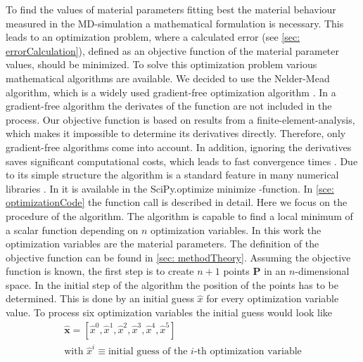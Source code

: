 To find the values of material parameters fitting best the material behaviour measured in the MD-simulation a mathematical formulation is necessary. This leads to an optimization problem, where a calculated error (see \autoref{sec: errorCalculation}), defined as an objective function of the material parameter values, should be minimized. To solve this optimization problem various mathematical algorithms are available. We decided to use the Nelder-Mead algorithm, which is a widely used gradient-free optimization algorithm \cite{gao_implementing_2012}. In a gradient-free algorithm the derivates of the function are not included in the process. Our objective function is based on results from a finite-element-analysis, which makes it impossible to determine its derivatives directly. Therefore, only gradient-free algorithms come into account. In addition, ignoring the derivatives saves significant computational costs, which leads to fast convergence times \cite{pham_comparative_2011}. Due to its simple structure the algorithm is a standard feature in many numerical libraries \cite{singer_efficient_2004}. In  it is available in the SciPy.optimize minimize -function. In \autoref{sce: optimizationCode} the function call is described in detail. Here we focus on the procedure of the algorithm. The algorithm is capable to find a local minimum of a scalar function depending on $n$ optimization variables. In this work the optimization variables are the material parameters. The definition of the objective function can be found in \autoref{sec: methodTheory}. Assuming the objective function is known, the first step is to create $n+1$ points $\mathbf{P}$ in an $n$-dimensional space. In the initial step of the algorithm the position of the points has to be determined. This is done by an initial guess $\hat{x}$ for every optimization variable value. To process six optimization variables the initial guess would look like
\begin{gather*}
    \mathbf{\hat{x}} = [\hat{x}^0, \hat{x}^1, \hat{x}^2, \hat{x}^3, \hat{x}^4, \hat{x}^5] \\
    \text{with } \hat{x}^i \equiv \text{initial guess of the $i$-th optimization variable}
\end{gather*}


